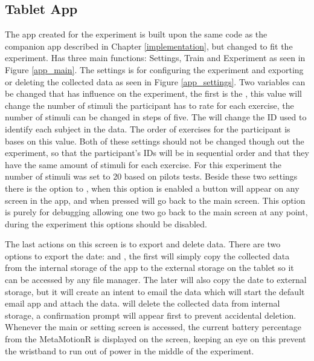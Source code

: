 \subsection{Tablet App}
The app created for the experiment is built upon the same code as the companion app described in Chapter \ref{implementation}, but changed to fit the experiment. Has three main functions: Settings, Train and Experiment as seen in Figure \ref{app_main}. The settings is for configuring the experiment and exporting or deleting the collected data as seen in Figure \ref{app_settings}. Two variables can be changed that has influence on the experiment, the first is the , this value will change the number of stimuli the participant has to rate for each exercise, the number of stimuli can be changed in steps of five. The  will change the ID used to identify each subject in the data. The order of exercises for the participant is bases on this value. Both of these settings should not be changed though out the experiment, so that the participant's IDs will be in sequential order and that they have the same amount of stimuli for each exercise. For this experiment the number of stimuli was set to 20 based on pilots tests. Beside these two settings there is the option to , when this option is enabled a  button will appear on any screen in the app, and when pressed will go back to the main screen. This option is purely for debugging allowing one two go back to the main screen at any point, during the experiment this options should be disabled. 

The last actions on this screen is to export and delete data. There are two options to export the date:  and , the first will simply copy the collected data from the internal storage of the app to the external storage on the tablet so it can be accessed by any file manager. The later will also copy the date to external storage, but it will create an intent to email the data which will start the default email app and attach the data.  will delete the collected data from internal storage, a confirmation prompt will appear first to prevent accidental deletion. Whenever the main or setting screen is accessed, the current battery percentage from the MetaMotionR is displayed on the screen, keeping an eye on this prevent the wristband to run out of power in the middle of the experiment.

